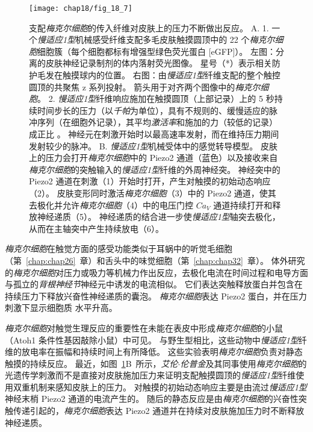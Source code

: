 \begin{figure}[htbp]
	\centering
	\texttt{[image: chap18/fig\_18\_7]}
	\caption{支配\textit{梅克尔细胞}的传入纤维对皮肤上的压力不断做出反应。
		A. 1. 一个\textit{慢适应1型}机械感受纤维支配多毛皮肤触摸圆顶中的 22 个\textit{梅克尔细胞}细胞簇（每个细胞都标有增强型绿色荧光蛋白 [eGFP]）。
		左图：分离的皮肤神经记录制剂的体内落射荧光图像。
		星号（*）表示相关防护毛发在触摸球内的位置。
		右图：由\textit{慢适应1型}纤维支配的整个触控圆顶的共聚焦 z 系列投射。
		箭头用于对齐两个图像中的\textit{梅克尔细胞}。
		2. \textit{慢适应1型}纤维响应施加在触摸圆顶（上部记录）上的 5 秒持续时间步长的压力（以\textit{千帕}为单位），具有不规则的、缓慢适应的脉冲序列（在细胞外记录），其平均\textit{激活率}和施加的力（较低的记录）成正比 。
		神经元在刺激开始时以最高速率发射，而在维持压力期间发射较少的脉冲。
		B. \textit{慢适应1型}机械受体中的感觉转导模型。
		皮肤上的压力会打开\textit{梅克尔细胞}中的 Piezo2 通道（蓝色）以及接收来自\textit{梅克尔细胞}的突触输入的\textit{慢适应1型}纤维的外周神经突。
		神经突中的 Piezo2 通道在刺激（1）开始时打开，产生对触摸的初始动态响应（2）。
		皮肤变形同时激活\textit{梅克尔细胞}（3）中的 Piezo2 通道，使其去极化并允许\textit{梅克尔细胞}（4）中的电压门控 $Ca_V$ 通道持续打开和释放神经递质（5）。
		神经递质的结合进一步使\textit{慢适应1型}轴突去极化，从而在主轴突中产生持续放电（6）\cite{maksimovic2014epidermal}。}
	\label{fig:18_7}
\end{figure}


\textit{梅克尔细胞}在触觉方面的感受功能类似于耳蜗中的听觉毛细胞（第~\ref{chap:chap26}~章）和舌头中的味觉细胞（第~\ref{chap:chap32}~章）。
体外研究的\textit{梅克尔细胞}对压力或吸力等机械力作出反应，去极化电流在时间过程和电导方面与孤立的\textit{背根神经节}神经元中诱发的电流相似。
它们表达突触释放蛋白并包含在持续压力下释放兴奋性神经递质的囊泡。
\textit{梅克尔细胞}表达 Piezo2 蛋白，并在压力刺激下显示细胞质  水平升高。


\textit{梅克尔细胞}对触觉生理反应的重要性在未能在表皮中形成\textit{梅克尔细胞}的小鼠（Atoh1 条件性基因敲除小鼠）中可见。
与野生型相比，这些动物中\textit{慢适应1型}纤维的放电率在振幅和持续时间上有所降低。
这些实验表明\textit{梅克尔细胞}负责对静态触摸的持续反应。 
最近，如图~\ref{fig:18_7}B~所示，\textit{艾伦$\cdot$伦普金}及其同事使用\textit{梅克尔细胞}的光遗传学刺激而不是直接对皮肤施加压力来证明支配触摸圆顶的\textit{慢适应1型}纤维使用双重机制来感知皮肤上的压力。
对触摸的初始动态响应主要是由流过\textit{慢适应1型}神经末梢 Piezo2 通道的电流产生的。
随后的静态反应是由\textit{梅克尔细胞}的兴奋性突触传递引起的，\textit{梅克尔细胞}表达 Piezo2 通道并在持续对皮肤施加压力时不断释放神经递质。


